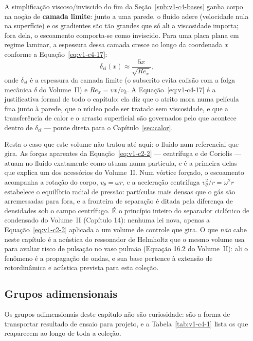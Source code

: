 \documentclass[12pt,a4paper]{article}
\numberwithin{equation}{section}
\numberwithin{table}{section}
\numberwithin{figure}{section}
\begin{document}
A simplificação viscoso/inviscido do fim da
Seção~\ref{sub:v1-c4-bases} ganha corpo na noção de \textbf{camada limite}:
junto a uma parede, o fluido adere (velocidade nula na superfície) e os
gradientes são tão grandes que só ali a viscosidade importa; fora dela, o
escoamento comporta-se como inviscido. Para uma placa plana em regime
laminar, a espessura dessa camada cresce ao longo da coordenada $x$ conforme
a Equação~\eqref{eq:v1-c4-17}:
\begin{equation}\label{eq:v1-c4-17}
\delta_{cl}(x) \approx \frac{5x}{\sqrt{Re_x}},
\end{equation}
onde $\delta_{cl}$ é a espessura da camada limite (o subscrito evita colisão
com a folga mecânica $\delta$ do Volume~II) e $Re_x = vx/\nu_k$. A
Equação~\eqref{eq:v1-c4-17} é a justificativa formal de todo o capítulo: ela
diz que o atrito mora numa película fina junto à parede, que o núcleo pode
ser tratado sem viscosidade, e que a transferência de calor e o arrasto
superficial são governados pelo que acontece dentro de $\delta_{cl}$ ---
ponte direta para o Capítulo~\ref{sec:calor}.

Resta o caso que este volume não tratou até aqui: o fluido num referencial
que gira. As forças aparentes da Equação~\eqref{eq:v1-c2-2} --- centrífuga e
de Coriolis --- atuam no fluido exatamente como atuam numa partícula, e é a
primeira delas que explica um dos acessórios do Volume~II. Num vórtice
forçado, o escoamento acompanha a rotação do corpo, $v_\theta = \omega r$, e
a aceleração centrífuga $v_\theta^2/r = \omega^2 r$ estabelece o equilíbrio
radial de pressão: partículas mais densas que o gás são arremessadas para
fora, e a fronteira de separação é ditada pela diferença de densidades sob o
campo centrífugo. É o princípio inteiro do separador ciclônico de condensado
do Volume~II (Capítulo 14): nenhuma lei nova, apenas a
Equação~\eqref{eq:v1-c2-2} aplicada a um volume de controle que gira. O que
\emph{não} cabe neste capítulo é a acústica do ressonador de Helmholtz que o
mesmo volume usa para avaliar risco de pulsação no vaso pulmão (Equação 16.2
do Volume~II): ali o fenômeno é a propagação de ondas, e sua base pertence à
extensão de rotordinâmica e acústica prevista para esta coleção.

\subsection{Grupos adimensionais}\label{sub:v1-c4-adimensionais}

Os grupos adimensionais deste capítulo não são curiosidade: são a forma de
transportar resultado de ensaio para projeto, e a Tabela~\ref{tab:v1-c4-1}
lista os que reaparecem ao longo de toda a coleção.
\end{document}
